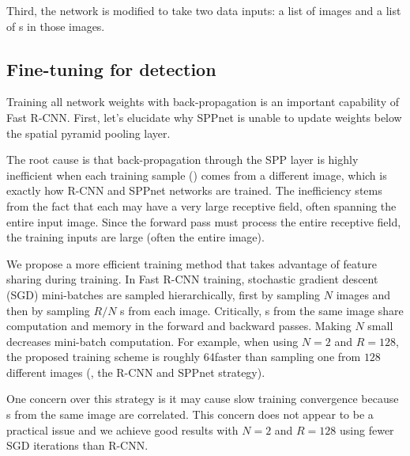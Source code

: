 Third, the network is modified to take two data inputs: a list of images and a list of {\roi}s in those images.

\subsection{Fine-tuning for detection}
Training all network weights with back-propagation is an important capability of Fast R-CNN.
First, let's elucidate why SPPnet is unable to update weights below the spatial pyramid pooling layer.

The root cause is that back-propagation through the SPP layer is highly inefficient when each training sample (\ie \roi) comes from a different image, which is exactly how R-CNN and SPPnet networks are trained.
The inefficiency stems from the fact that each \roi may have a very large receptive field, often spanning the entire input image.
Since the forward pass must process the entire receptive field, the training inputs are large (often the entire image).

We propose a more efficient training method that takes advantage of feature sharing during training.
In Fast R-CNN training, stochastic gradient descent (SGD) mini-batches are sampled hierarchically, first by sampling $N$ images and then by sampling $R/N$ {\roi}s from each image.
Critically, {\roi}s from the same image share computation and memory in the forward and backward passes.
Making $N$ small decreases mini-batch computation.
For example, when using $N = 2$ and $R = 128$, the proposed training scheme is roughly 64\X faster than sampling one {\roi} from $128$ different images (\ie, the R-CNN and SPPnet strategy).

One concern over this strategy is it may cause slow training convergence because {\roi}s from the same image are correlated.
This concern does not appear to be a practical issue and we achieve good results with $N = 2$ and $R = 128$ using fewer SGD iterations than R-CNN.

